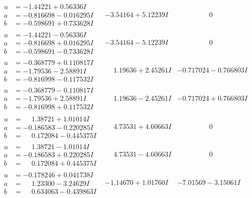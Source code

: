 \documentclass[1p]{elsarticle_modified}
\theoremstyle{definition}
\begin{document}
$$\begin{array}{c|c|c}
\begin{aligned}
u &= -1.44221 + 0.56336 I \\
a &= -0.816698 - 0.016295 I \\
b &= -0.598691 + 0.733628 I\end{aligned}
 & -3.54164 + 5.12239 I & \phantom{-0.000000 } 0 \\ \hline\begin{aligned}
u &= -1.44221 - 0.56336 I \\
a &= -0.816698 + 0.016295 I \\
b &= -0.598691 - 0.733628 I\end{aligned}
 & -3.54164 - 5.12239 I & \phantom{-0.000000 } 0 \\ \hline\begin{aligned}
u &= -0.368779 + 0.110817 I \\
a &= -1.79536 - 2.58891 I \\
b &= -0.816998 - 0.117532 I\end{aligned}
 & \phantom{-}1.19636 + 2.45261 I & -0.717024 - 0.766803 I \\ \hline\begin{aligned}
u &= -0.368779 - 0.110817 I \\
a &= -1.79536 + 2.58891 I \\
b &= -0.816998 + 0.117532 I\end{aligned}
 & \phantom{-}1.19636 - 2.45261 I & -0.717024 + 0.766803 I \\ \hline\begin{aligned}
u &= \phantom{-}1.38721 + 1.01014 I \\
a &= -0.186583 - 0.220285 I \\
b &= \phantom{-}0.172084 - 0.445375 I\end{aligned}
 & \phantom{-}4.73531 + 4.60663 I & \phantom{-0.000000 } 0 \\ \hline\begin{aligned}
u &= \phantom{-}1.38721 - 1.01014 I \\
a &= -0.186583 + 0.220285 I \\
b &= \phantom{-}0.172084 + 0.445375 I\end{aligned}
 & \phantom{-}4.73531 - 4.60663 I & \phantom{-0.000000 } 0 \\ \hline\begin{aligned}
u &= -0.178246 + 0.041738 I \\
a &= \phantom{-}1.23300 - 3.24629 I \\
b &= \phantom{-}0.634063 - 0.439863 I\end{aligned}
 & -1.14670 + 1.01760 I & -7.01569 - 3.15061 I \\ \hline\begin{aligned}

\end{aligned}
\end{array}$$
\end{document}
